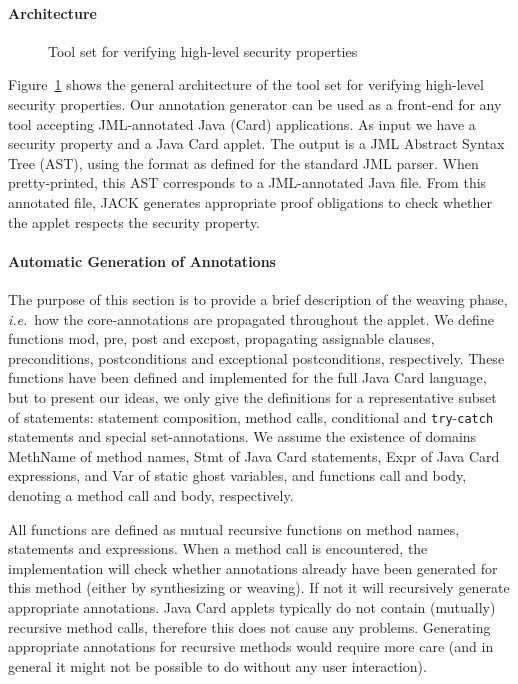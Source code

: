 \paragraph*{Architecture}

\begin{figure}[pht]
\begin{center}
\end{center}
\caption{\sc Tool set for verifying high-level security properties}\label{FigArch}
\end{figure}



Figure~\ref{FigArch} shows the general architecture of the tool set
for verifying high-level security properties. Our annotation generator
can be used as a front-end for any tool accepting JML-annotated Java
(Card) applications. As input we have a security property and a Java
Card applet. The output is a JML Abstract Syntax Tree (AST), using the
format as defined for the standard JML parser. When pretty-printed,
this AST corresponds to a JML-annotated Java file. From this
annotated file, JACK generates appropriate proof obligations to check
whether the applet respects the security property.

\paragraph*{Automatic Generation of Annotations}
The purpose of this section is to provide a brief description of the
weaving phase, \emph{i.e.}~how the core-annotations are propagated
throughout the applet. We define functions \textsf{mod}, \textsf{pre},
\textsf{post} and \textsf{exc\-post}, propagating assignable clauses,
preconditions, postconditions and exceptional postconditions,
respectively. These functions have been defined and implemented for
the full Java Card language, but to present our ideas, we only give
the definitions for a representative subset of statements: statement
composition, method calls, conditional and \texttt{try}-\texttt{catch}
statements and special set-annotations. We assume the existence of
domains \textsf{MethName} of method names, \textsf{Stmt} of Java Card
statements, \textsf{Expr} of Java Card expressions, and \textsf{Var}
of static ghost variables, and functions \textsf{call} and
\textsf{body}, denoting a method call and body, respectively.

All functions are defined as mutual recursive functions on method
names, statements and expressions. When a method call is encountered,
the implementation will check whether annotations already have been
generated for this method (either by synthesizing or weaving). If not
it will recursively generate appropriate annotations. Java Card
applets typically do not contain (mutually) recursive method calls,
therefore this does not cause any problems. Generating appropriate
annotations for recursive methods would require more care (and in
general it might not be possible to do without any user interaction).


